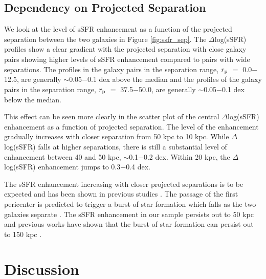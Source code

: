 \documentclass[iop,revtex4,twocolumn,apj,numberedappendix,appendixfloats]{emulateapj}
\begin{document}
\subsection{Dependency on Projected Separation}\label{sec:sep}

We look at the level of sSFR enhancement as a function of the projected separation between the two galaxies in Figure \ref{fig:ssfr_sep}. The $\Delta$log(sSFR) profiles show a clear gradient with the projected separation with close galaxy pairs showing higher levels of sSFR enhancement compared to pairs with wide separations. The profiles in the galaxy pairs in the separation range, $r_{\rm p}$ $=$ 0.0$-$12.5, are generally $\sim$0.05$-$0.1 dex above the median and the profiles of the galaxy pairs in the separation range, $r_{\rm p}$ $=$ 37.5$-$50.0, are generally $\sim$0.05$-$0.1 dex below the median. 

This effect can be seen more clearly in the scatter plot of the central $\Delta$log(sSFR) enhancement as a function of projected separation. The level of the enhancement gradually increases with closer separation from 50 kpc to 10 kpc. While $\Delta$log(sSFR) falls at higher separations, there is still a substantial level of enhancement between 40 and 50 kpc, $\sim$0.1$-$0.2 dex. Within 20 kpc, the $\Delta$log(sSFR) enhancement jumps to 0.3$-$0.4 dex. 

The sSFR enhancement increasing with closer projected separations is to be expected and has been shown in previous studies \citep{Li:2008, Ellison:2008, Scudder:2012, Patton:2013}. The passage of the first pericenter is predicted to trigger a burst of star formation which falls as the two galaxies separate \citep{Scudder:2012}. The sSFR enhancement in our sample persists out to 50 kpc and previous works have shown that the burst of star formation can persist out to 150 kpc \citep{Patton:2013}. 



\section{Discussion}\label{sec:disc}

\end{document}
